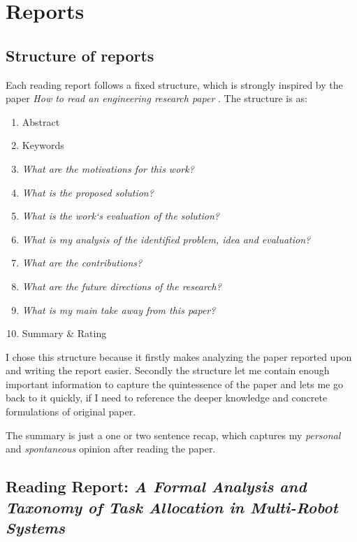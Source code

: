 


    \chapter{Reports}

    \section*{Structure of reports}

    Each reading report follows a fixed structure, which is strongly inspired by the paper \emph{How to read an engineering research paper} \cite{Griswold2009}.
    The structure is as: \ \begin{enumerate}
        \item Abstract
        \item Keywords
        \item \emph{What are the motivations for this work?}
        \item \emph{What is the proposed solution?}
        \item \emph{What is the work‘s evaluation of the solution?}
        \item \emph{What is my analysis of the identified problem, idea and evaluation?}
        \item \emph{What are the contributions?}
        \item \emph{What are the future directions of the research?}
        \item \emph{What is my main take away from this paper?}
        \item Summary \& Rating
    \end{enumerate}

    I chose this structure because it firstly makes analyzing the paper reported upon and writing the report easier. Secondly the structure let me contain enough important information to capture the quintessence of the paper and lets me go back to it quickly, if I need to reference the deeper knowledge and concrete formulations of original paper.

    The summary is just a one or two sentence recap, which captures my \emph{personal} and \emph{spontaneous} opinion after reading the paper. 
    \newpage

    \section{Reading Report: \emph{A Formal Analysis and Taxonomy of Task Allocation in Multi-Robot Systems
    }}
    \cite{Gerkey2004}
    

